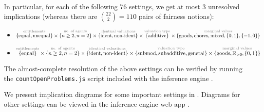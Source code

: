 In particular, for each of the following 76 settings, we get at most 3 unresolved implications
(whereas there are $\binom{22}{2} = 110$ pairs of fairness notions):
%
\begin{itemize}
\ifColsOne\raggedright\fi
\item $\overset{\text{\textcolor{gray}{entitlements}}}{\{\text{equal}, \text{unequal}\}}
    \times \overset{\text{\textcolor{gray}{no.\ of agents}}}{\{n \ge 2, n = 2\}}
    \times \overset{\text{\textcolor{gray}{identical valuations}}}{\{\text{ident}, \text{non-ident}\}}
    \times \overset{\text{\textcolor{gray}{valuation type}}}{\{\text{additive}\}}
    \times \overset{\text{\textcolor{gray}{marginal values}}}{\{\text{goods}, \text{chores}, \text{mixed}, \{0, 1\}, \{-1, 0\}\}}$
\item $\overset{\text{\textcolor{gray}{entitlements}}}{\{\text{equal}\}}
    \times \overset{\text{\textcolor{gray}{no.\ of agents}}}{\{n \ge 2, n = 2\}}
    \times \overset{\text{\textcolor{gray}{identical valuations}}}{\{\text{ident}, \text{non-ident}\}}
    \times \overset{\text{\textcolor{gray}{valuation type}}}{\{\text{submod}, \text{subadditive}, \text{general}\}}
    \times \overset{\text{\textcolor{gray}{marginal values}}}{\{\text{goods}, \mathbb{R}_{>0}, \{0, 1\}\}}$
\end{itemize}

The almost-complete resolution of the above settings can be verified by running
the \texttt{countOpenProblems.js} script included with the inference engine \citep{cpigjsEku}.

We present implication diagrams for some important settings in \dagsRef{}.
Diagrams for other settings can be viewed in the inference engine web app \citep{cpigjsEku}.

